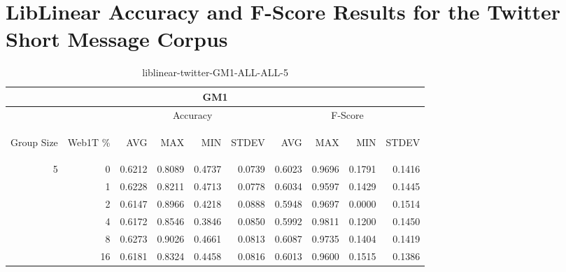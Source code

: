 \chapter{LibLinear Accuracy and F-Score Results for the Twitter Short Message Corpus}

\begin{center}
\begin{table}[htbp] 
 \begin{center}
\begin{tabular}{ | r | r | r | r | r | r | r | r | r | r |}
\hline
\multicolumn{10}{|c|}{GM1}\\
\hline
 & & \multicolumn{4}{|c|}{Accuracy} & \multicolumn{4}{|c|}{F-Score}\\ \cline{3-10}
\begin{sideways}Group Size\end{sideways} & \begin{sideways}Web1T \%\end{sideways} & \begin{sideways}AVG\end{sideways} & \begin{sideways}MAX\end{sideways} & \begin{sideways}MIN\end{sideways} & \begin{sideways}STDEV\end{sideways} & \begin{sideways}AVG\end{sideways} & \begin{sideways}MAX\end{sideways} & \begin{sideways}MIN\end{sideways} & \begin{sideways}STDEV\end{sideways}\\
\hline
\multirow{5}{*}{5}
 & 0 & 0.6212 & 0.8089 & 0.4737 & 0.0739 & 0.6023 & 0.9696 & 0.1791 & 0.1416\\ \cline{2-10}
 & 1 & 0.6228 & 0.8211 & 0.4713 & 0.0778 & 0.6034 & 0.9597 & 0.1429 & 0.1445\\ \cline{2-10}
 & 2 & 0.6147 & 0.8966 & 0.4218 & 0.0888 & 0.5948 & 0.9697 & 0.0000 & 0.1514\\ \cline{2-10}
 & 4 & 0.6172 & 0.8546 & 0.3846 & 0.0850 & 0.5992 & 0.9811 & 0.1200 & 0.1450\\ \cline{2-10}
 & 8 & 0.6273 & 0.9026 & 0.4661 & 0.0813 & 0.6087 & 0.9735 & 0.1404 & 0.1419\\ \cline{2-10}
 & 16 & 0.6181 & 0.8324 & 0.4458 & 0.0816 & 0.6013 & 0.9600 & 0.1515 & 0.1386\\ \cline{2-10}
\hline
\end{tabular}
\caption{liblinear-twitter-GM1-ALL-ALL-5}
\label{table:liblinear-twitter-GM1-ALL-ALL-5}
\end{center}
 \end{table}
\end{center}

